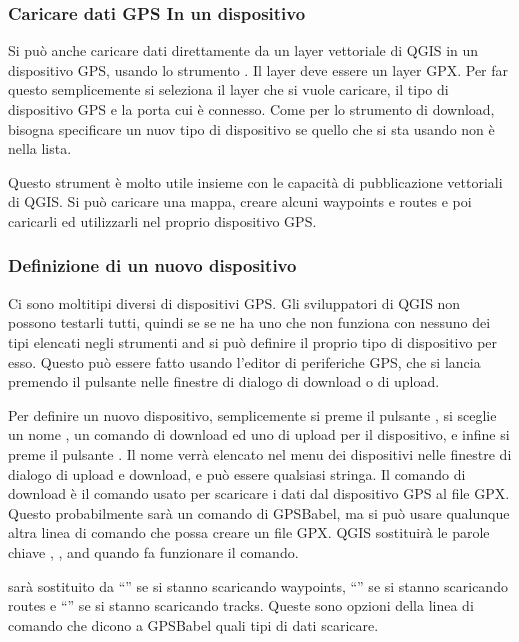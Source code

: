 \subsubsection{Caricare dati GPS In un dispositivo}

Si può anche caricare dati direttamente da un layer vettoriale di QGIS in un dispositivo GPS, usando lo strumento .
Il layer deve essere un layer GPX.
Per far questo semplicemente si seleziona il layer che si vuole caricare, il tipo di dispositivo GPS e la porta cui è connesso.
Come per lo strumento di download, bisogna specificare un nuov tipo di dispositivo se quello che si sta usando non è nella lista.

Questo strument è molto utile insieme con le capacità di pubblicazione vettoriali di QGIS.
Si può caricare una mappa, creare alcuni waypoints e routes e poi caricarli ed utilizzarli nel proprio dispositivo GPS.

\subsubsection{\label{sec:Defining-new-device}Definizione di un nuovo dispositivo}

Ci sono moltitipi diversi di dispositivi GPS.
Gli sviluppatori di QGIS non possono testarli tutti, quindi se se ne ha uno che non funziona con nessuno dei tipi elencati negli strumenti  and  si può definire il proprio tipo di dispositivo per esso.
Questo può essere fatto usando l'editor di periferiche GPS, che si lancia premendo il pulsante  nelle finestre di dialogo di download o di upload.

Per definire un nuovo dispositivo, semplicemente si preme il pulsante , si sceglie un nome , un comando di download ed uno di upload per il dispositivo, e infine si preme il pulsante .
Il nome verrà elencato nel menu dei dispositivi nelle finestre di dialogo di upload e download, e può essere qualsiasi stringa.
Il comando di download è il comando usato per scaricare i dati dal dispositivo GPS al file GPX.
Questo probabilmente sarà un comando di GPSBabel, ma si può usare qualunque altra linea di comando che possa creare un file GPX.
QGIS sostituirà le parole chiave , , and  quando fa funzionare il comando.

 sarà sostituito da {}``'' se si stanno scaricando waypoints, {}``'' se si stanno scaricando routes e {}``'' se si stanno scaricando tracks.
Queste sono opzioni della linea di comando che dicono a GPSBabel quali tipi di dati scaricare.

